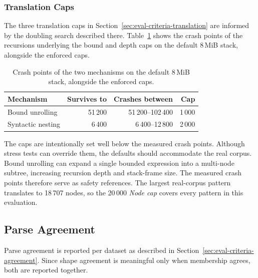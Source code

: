 %
%
%

\subsubsection{Translation Caps}
\label{sec:eval-translate-caps}

The three translation caps in Section~\ref{sec:eval-criteria-translation}
are informed by the doubling search described there.
Table~\ref{tab:translate-caps} shows the crash points of the
recursions underlying the bound and depth caps on the default
8\,MiB stack, alongside the enforced caps.

\begin{table}[H]
\centering
\small
\begin{tabular*}{\textwidth}{@{\extracolsep{\fill}} lrrr}
\hline
Mechanism & Survives to & Crashes between & Cap \\
\hline
Bound unrolling    & 51\,200 & 51\,200--102\,400 & 1\,000 \\
Syntactic nesting  &  6\,400 &   6\,400--12\,800  & 2\,000 \\
\hline
\end{tabular*}
\caption{Crash points of the two mechanisms on the default 8\,MiB
stack, alongside the enforced caps.}
\label{tab:translate-caps}
\end{table}

The caps are intentionally set well below the measured crash points.
Although stress tests can override them, 
the defaults should accommodate the real corpus. 
Bound unrolling can expand a single bounded expression into a multi-node subtree,
increasing recursion depth and stack-frame size. 
The measured crash points therefore serve as safety references.
The largest real-corpus pattern translates to 18\,707 nodes, 
so the 20\,000 \emph{Node cap} covers every pattern in this evaluation.

%
%
%

\subsection{Parse Agreement}
\label{sec:eval-agreement}

Parse agreement is reported per dataset as described 
in Section~\ref{sec:eval-criteria-agreement}. 
Since shape agreement is meaningful only when membership agrees, 
both are reported together.

